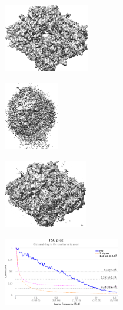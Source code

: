 \begin{figure}[t]
    \vspace{1em}
    \begin{subfigure}[b]{0.23\linewidth}
        \centering
        \includegraphics[height=3cm]{figures/r5a1a_quartercov_uniformS2_noise0_halfInplane_gt.png}
        \caption{}\label{fig:5a1a-noise0-reconstruction-true}
    \end{subfigure}
    \hfill
    \begin{subfigure}[b]{0.18\linewidth}
        \centering
        \includegraphics[height=3cm]{figures/r5a1a_quartercov_uniformS2_noise0_halfInplane_rand.png}
        \caption{}
    \end{subfigure}
    \hfill
    \begin{subfigure}[b]{0.23\linewidth}
        \centering
        \includegraphics[height=3cm]{figures/r5a1a_quartercov_uniformS2_noise0_halfInplane_apr.png}
        \caption{}\label{fig:5a1a-noise0-reconstruction-recovered}
    \end{subfigure}
    \hfill
    \begin{subfigure}[b]{0.31\linewidth}
        \centering
        \includegraphics[height=3cm]{figures/r5a1a_quartercov_uniformS2_noise0_halfInplane_FSC_apr_init.pdf}

\end{subfigure}
\end{figure}
